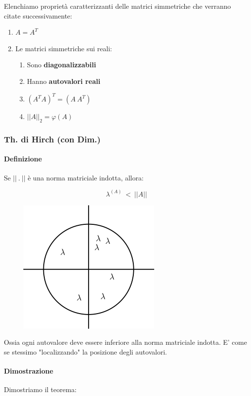 \documentclass{article}
\begin{document}
Elenchiamo proprietà caratterizzanti delle matrici simmetriche che verranno citate successivamente:

\begin{enumerate}
    \item $A = A^T$
    \item Le matrici simmetriche sui reali:
    \begin{enumerate}
        \item Sono \textbf{diagonalizzabili}
        \item Hanno \textbf{autovalori reali}
    \item $(A^TA)^T = (A\:A^T)$
    \item $||A||_2 = \varphi(A)$
    \end{enumerate}
\end{enumerate}

\subsubsection{Th. di Hirch (con Dim.)}

\paragraph{Definizione} Se $||\: .\:||$ è una norma matriciale indotta, allora:

\[ \lambda^{(A)} \: < \:||A|| \]


\begin{figure}[htbp]
    \center
    \includegraphics[scale=0.55]{img/th_hirch.png}
\end{figure}

Ossia ogni autovalore deve essere inferiore alla norma matriciale indotta.
E' come se stessimo "localizzando" la posizione degli autovalori.

\paragraph{Dimostrazione} Dimostriamo il teorema:
\end{document}
